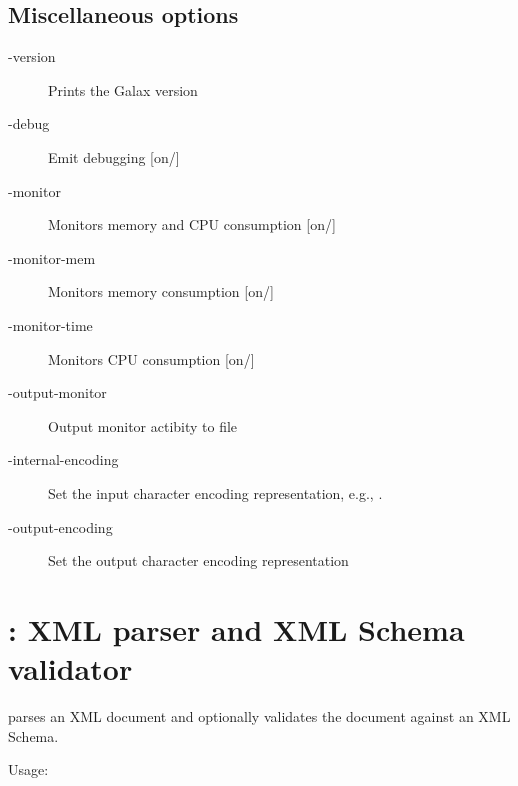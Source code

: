
\subsection{Miscellaneous options}
\begin{description}
\item[-version]  Prints the Galax version
\item[-debug]  Emit debugging [on/]

\item[-monitor] Monitors memory and CPU consumption [on/]
\item[-monitor-mem]  Monitors memory consumption [on/]
\item[-monitor-time]  Monitors CPU consumption [on/]
\item[-output-monitor]  Output monitor actibity to file

\item[-internal-encoding]  Set the input character encoding
  representation, e.g., .
\item[-output-encoding]  Set the output character encoding representation
\end{description}

\section{: XML parser and XML Schema validator}

 parses an XML document and optionally validates the
document against an XML Schema.

Usage: 

